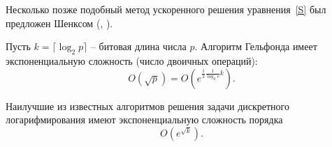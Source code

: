 Несколько позже подобный метод ускоренного решения уравнения~\ref{S} был предложен Шенксом (, \cite{Shanks:1971}).

Пусть $k = \lceil \log_2 p \rceil$ -- битовая длина числа $p$. Алгоритм Гельфонда имеет экспоненциальную сложность (число двоичных операций):
    \[ O\left(\sqrt{p}\right) = O\left(e^{\frac{1}{2} \frac{1}{\log_2 e} k}\right). \]

Наилучшие из известных алгоритмов решения задачи дискретного логарифмирования имеют экспоненциальную сложность порядка
    \[ O\left(e^{\sqrt{k}}\right). \]

